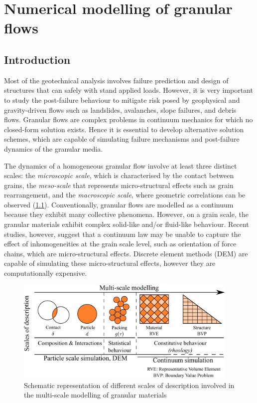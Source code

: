 \chapter{Numerical modelling of granular flows}

\ifpdf
    \graphicspath{{Chapter3/figs/raster/}{Chapter3/figs/pdf/}{Chapter3/figs/}}
\else
    \graphicspath{{Chapter3/figs/vector/}{Chapter3/figs/}}
\fi
\label{chapter:numerical_modelling}
\section{Introduction}

Most of the geotechnical analysis involves failure prediction and design of 
structures that can safely with stand applied loads. However, it is very 
important to study the post-failure behaviour to mitigate risk posed by 
geophysical and gravity-driven flows such as landslides, avalanches, slope 
failures, and debris flows. Granular flows are complex problems in continuum 
mechanics for which no closed-form solution exists. Hence it is essential to 
develop alternative solution schemes, which are capable of simulating failure 
mechanisms and post-failure dynamics of the granular media. 

The dynamics of a homogeneous granular flow involve at least three distinct 
scales: the \textit{microscopic scale}, which is characterised by the contact 
between grains, the \textit{meso-scale} that represents micro-structural 
effects such as grain rearrangement, and the \textit{macroscopic scale}, where 
geometric correlations can be observed (\cref{fig:multiscale}). Conventionally, 
granular flows are modelled as a continuum because they exhibit many collective 
phenomena. However, on a grain scale, the granular materials exhibit complex 
solid-like and/or fluid-like behaviour. Recent studies, however, suggest that a 
continuum law may be unable to capture the effect of inhomogeneities at the 
grain scale level, such as orientation of force chains, which are 
micro-structural effects. Discrete element methods (DEM) are capable of 
simulating these micro-structural effects, however they are computationally 
expensive. 

\begin{figure}[tbhp]
\centering
\includegraphics[width=0.95\textwidth]{multiscale}
\caption{Schematic representation of different scales of description involved 
in the multi-scale modelling of granular materials}
\label{fig:multiscale}
\end{figure}


